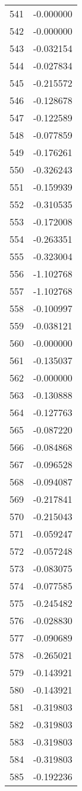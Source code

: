 \documentclass[12pt]{article}
\begin{document}
\begin{longtable}{@{}cc@{}}
541 & -0.000000 \\
542 & -0.000000 \\
543 & -0.032154 \\
544 & -0.027834 \\
545 & -0.215572 \\
546 & -0.128678 \\
547 & -0.122589 \\
548 & -0.077859 \\
549 & -0.176261 \\
550 & -0.326243 \\
551 & -0.159939 \\
552 & -0.310535 \\
553 & -0.172008 \\
554 & -0.263351 \\
555 & -0.323004 \\
556 & -1.102768 \\
557 & -1.102768 \\
558 & -0.100997 \\
559 & -0.038121 \\
560 & -0.000000 \\
561 & -0.135037 \\
562 & -0.000000 \\
563 & -0.130888 \\
564 & -0.127763 \\
565 & -0.087220 \\
566 & -0.084868 \\
567 & -0.096528 \\
568 & -0.094087 \\
569 & -0.217841 \\
570 & -0.215043 \\
571 & -0.059247 \\
572 & -0.057248 \\
573 & -0.083075 \\
574 & -0.077585 \\
575 & -0.245482 \\
576 & -0.028830 \\
577 & -0.090689 \\
578 & -0.265021 \\
579 & -0.143921 \\
580 & -0.143921 \\
581 & -0.319803 \\
582 & -0.319803 \\
583 & -0.319803 \\
584 & -0.319803 \\
585 & -0.192236 \\

\end{longtable}
\end{document}
